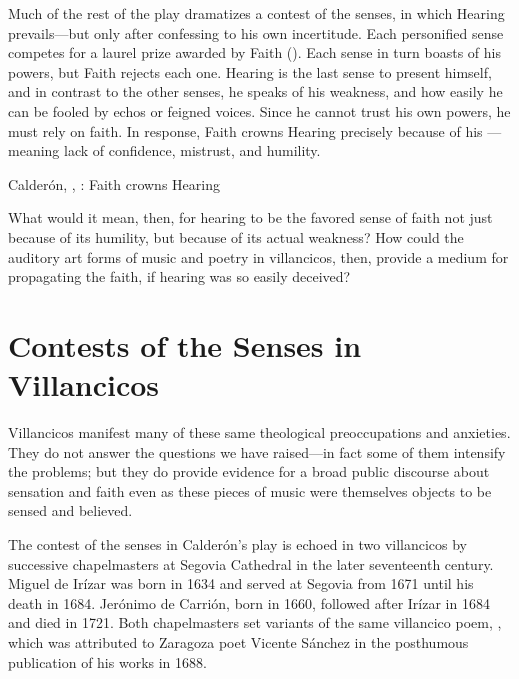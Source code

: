 Much of the rest of the play dramatizes a contest of the senses, in which Hearing prevails---but only after confessing to his own incertitude.
Each personified sense competes for a laurel prize awarded by Faith ().
Each sense in turn boasts of his powers, but Faith rejects each one.
Hearing is the last sense to present himself, and in contrast to the other senses, he speaks of his weakness, and how easily he can be fooled by echos or feigned voices.
Since he cannot trust his own powers, he must rely on faith.
In response, Faith crowns Hearing precisely because of his ---meaning lack of confidence, mistrust, and humility.

\begin{expoem}
  \caption{Calderón, , : Faith crowns Hearing}
  \label{expoem:Calderon-Retiro-Hearing}
\end{expoem}

What would it mean, then, for hearing to be the favored sense of faith not just because of its humility, but because of its actual weakness?
How could the auditory art forms of music and poetry in villancicos, then, provide a medium for propagating the faith, if hearing was so easily deceived?

\section{Contests of the Senses in Villancicos}

Villancicos manifest many of these same theological preoccupations and anxieties.
They do not answer the questions we have raised---in fact some of them intensify the problems; but they do provide evidence for a broad public discourse about sensation and faith even as these pieces of music were themselves objects to be sensed and believed.

The contest of the senses in Calderón's play is echoed in two villancicos by successive chapelmasters at Segovia Cathedral in the later seventeenth century.
Miguel de Irízar was born in 1634 and served at Segovia from 1671 until his death in 1684.
Jerónimo de Carrión, born in 1660, followed after Irízar in 1684 and died in 1721.
Both chapelmasters set variants of the same villancico poem, , which was attributed to Zaragoza poet Vicente Sánchez in the posthumous publication of his works in 1688.

